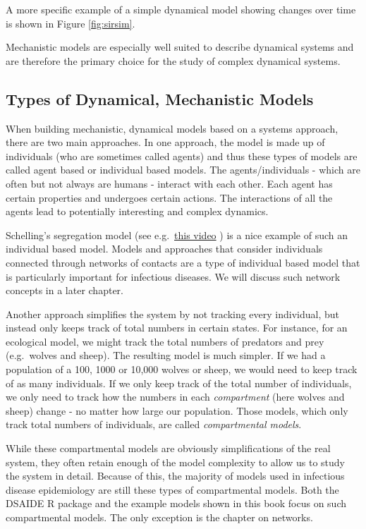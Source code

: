 \documentclass[
]{book}
\begin{document}
A more specific example of a simple dynamical model showing changes over time is shown in Figure \ref{fig:sirsim}.

Mechanistic models are especially well suited to describe dynamical systems and are therefore the primary choice for the study of complex dynamical systems.

\hypertarget{types-of-dynamical-mechanistic-models}{%
\subsection{Types of Dynamical, Mechanistic Models}\label{types-of-dynamical-mechanistic-models}}

When building mechanistic, dynamical models based on a systems approach, there are two main approaches. In one approach, the model is made up of individuals (who are sometimes called agents) and thus these types of models are called agent based or individual based models. The agents/individuals - which are often but not always are humans - interact with each other. Each agent has certain properties and undergoes certain actions. The interactions of all the agents lead to potentially interesting and complex dynamics.

Schelling's segregation model (see e.g.~\href{https://youtu.be/dFl3Cfw12bo}{this video} ) is a nice example of such an individual based model. Models and approaches that consider individuals connected through networks of contacts are a type of individual based model that is particularly important for infectious diseases. We will discuss such network concepts in a later chapter.

Another approach simplifies the system by not tracking every individual, but instead only keeps track of total numbers in certain states. For instance, for an ecological model, we might track the total numbers of predators and prey (e.g.~wolves and sheep). The resulting model is much simpler. If we had a population of a 100, 1000 or 10,000 wolves or sheep, we would need to keep track of as many individuals. If we only keep track of the total number of individuals, we only need to track how the numbers in each \emph{compartment} (here wolves and sheep) change - no matter how large our population. Those models, which only track total numbers of individuals, are called \emph{compartmental models}.

While these compartmental models are obviously simplifications of the real system, they often retain enough of the model complexity to allow us to study the system in detail. Because of this, the majority of models used in infectious disease epidemiology are still these types of compartmental models. Both the DSAIDE R package and the example models shown in this book focus on such compartmental models. The only exception is the chapter on networks.
\end{document}
